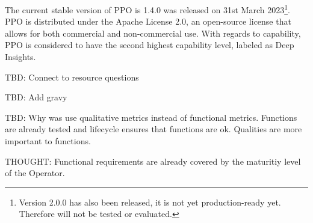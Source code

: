 The current stable version of PPO is 1.4.0 was released on 31st March 2023\footnote[3]{Version 2.0.0 has also been released, it is not yet production-ready yet. Therefore will not be tested or evaluated.}. \cite{PerconaDocuV2} PPO is distributed under the Apache License 2.0, an open-source license that allows for both commercial and non-commercial use. With regards to capability, PPO is considered to have the second highest capability level, labeled as Deep Insights. \cite{OperatorHubPercona}



TBD: Connect to resource questions

TBD: Add gravy

TBD: Why was use qualitative metrics instead of functional metrics. Functions are already tested and lifecycle ensures that functions are ok. Qualities are more important to functions.

THOUGHT: Functional requirements are already covered by the maturitiy level of the Operator.



